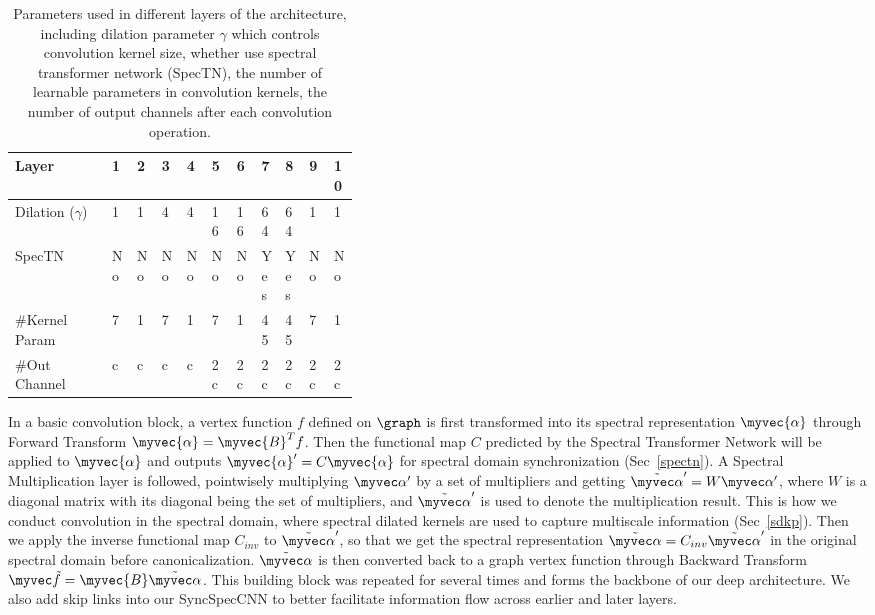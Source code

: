 \begin{table}[]
\centering
{\footnotesize
\begin{tabular}{@{}p{0.25\linewidth}p{0.015\linewidth}p{0.015\linewidth}p{0.015\linewidth}p{0.015\linewidth}p{0.015\linewidth}p{0.015\linewidth}p{0.017\linewidth}p{0.016\linewidth}p{0.016\linewidth}p{0.015\linewidth}}
\toprule
Layer               & 1  & 2  & 3  & 4  & 5  & 6  & 7   & 8   & 9  & 10 \\ \midrule
Dilation ($\gamma$) & 1  & 1  & 4  & 4  & 16 & 16 & 64   & 64   & 1  & 1  \\
SpecTN              & No & No & No & No & No & No & Yes & Yes & No & No \\
\#Kernel Param      & 7  & 1  & 7  & 1  & 7  & 1  & 45  & 45  & 7  & 1  \\
\#Out Channel    & c  & c  & c  & c  & 2c & 2c & 2c  & 2c  & 2c & 2c\\ \bottomrule
\end{tabular}
}
\caption{Parameters used in different layers of the architecture, including dilation parameter $\gamma$ which controls convolution kernel size, whether use spectral transformer network (SpecTN), the number of learnable parameters in convolution kernels, the number of output channels after each convolution operation.}
\label{tab:architecture}
\end{table}

In a basic convolution block, a vertex function $f$ defined on $\graph$ is first transformed into its spectral representation $\myvec{\alpha}$ through Forward Transform $\myvec{\alpha} = \myvec{B}^Tf$. Then the functional map $C$ predicted by the Spectral Transformer Network will be applied to $\myvec{\alpha}$ and outputs $\myvec{\alpha}'=C\myvec{\alpha}$ for spectral domain synchronization (Sec~\ref{spectn}). A Spectral Multiplication layer is followed, pointwisely multiplying $\myvec \alpha'$ by a set of multipliers and getting $\tilde{\myvec \alpha}' = W\myvec \alpha'$, where $W$ is a diagonal matrix with its diagonal being the set of multipliers, and $\tilde{\myvec \alpha}'$ is used to denote the multiplication result. This is how we conduct convolution in the spectral domain, where spectral dilated kernels are used to capture multiscale information (Sec~\ref{sdkp}). Then we apply the inverse functional map $C_{inv}$ to $\tilde{\myvec \alpha}'$, so that we get the spectral representation $\tilde{\myvec \alpha} = C_{inv}\tilde{\myvec \alpha}'$ in the original spectral domain before canonicalization. $\tilde{\myvec \alpha}$ is then converted back to a graph vertex function through Backward Transform $\myvec \tilde{f} = \myvec{B}\tilde{\myvec \alpha}$. This building block was repeated for several times and forms the backbone of our deep architecture. We also add skip links into our SyncSpecCNN to better facilitate information flow across earlier and later layers. 

